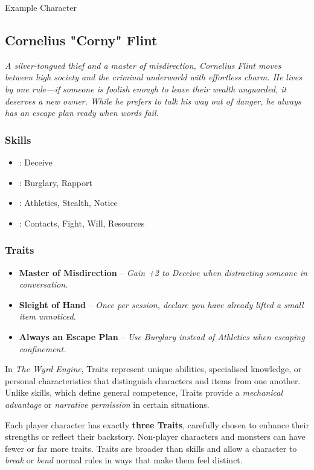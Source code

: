 \begin{DndSidebar}[float=!b]{Example Character}
	\subsection{Cornelius "Corny" Flint}
	\emph{A silver-tongued thief and a master of misdirection, Cornelius Flint moves between high society and the criminal underworld with effortless charm. He lives by one rule—if someone is foolish enough to leave their wealth unguarded, it deserves a new owner. While he prefers to talk his way out of danger, he always has an escape plan ready when words fail.}

	\subsubsection*{Skills}
	\begin{itemize}
    	\item \Expert: Deceive
	    \item \Skilled: Burglary, Rapport
    	\item \Novice: Athletics, Stealth, Notice
	    \item \Untrained: Contacts, Fight, Will, Resources
	\end{itemize}

	\subsubsection*{Traits}
	\begin{itemize}
    	\item \textbf{Master of Misdirection} – \emph{Gain +2 to Deceive when distracting someone in conversation.}
	    \item \textbf{Sleight of Hand} – \emph{Once per session, declare you have already lifted a small item unnoticed.}
	    \item \textbf{Always an Escape Plan} – \emph{Use Burglary instead of Athletics when escaping confinement.}
	\end{itemize}
\end{DndSidebar}


In \emph{The Wyrd Engine}, Traits represent unique abilities, specialised knowledge, or personal characteristics that distinguish characters and items from one another. Unlike skills, which define general competence, Traits provide a \emph{mechanical advantage} or \emph{narrative permission} in certain situations.

Each player character has exactly \textbf{three Traits}, carefully chosen to enhance their strengths or reflect their backstory. Non-player characters and monsters can have fewer or far more traits. Traits are broader than skills and allow a character to \emph{break} or \emph{bend} normal rules in ways that make them feel distinct.

